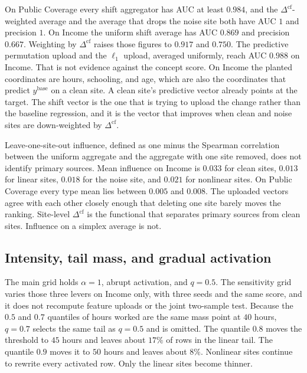 On Public Coverage every shift aggregator has AUC at least $0.984$, and
the $\Delta^{\mathrm{cf}}$-weighted average and the average that drops the
noise site both have AUC $1$ and precision $1$.
On Income the uniform shift average has AUC $0.869$ and precision $0.667$.
Weighting by $\Delta^{\mathrm{cf}}$ raises those figures to $0.917$ and
$0.750$.
The predictive permutation upload and the $\ell_1$ upload, averaged
uniformly, reach AUC $0.988$ on Income.
That is not evidence against the concept score.
On Income the planted coordinates are hours, schooling, and age, which are
also the coordinates that predict $y^{\mathrm{base}}$ on a clean site.
A clean site's predictive vector already points at the target.
The shift vector is the one that is trying to upload the change rather than
the baseline regression, and it is the vector that improves when clean and
noise sites are down-weighted by $\Delta^{\mathrm{cf}}$.

Leave-one-site-out influence, defined as one minus the Spearman
correlation between the uniform aggregate and the aggregate with one site
removed, does not identify primary sources.
Mean influence on Income is $0.033$ for clean sites, $0.013$ for linear
sites, $0.018$ for the noise site, and $0.021$ for nonlinear sites.
On Public Coverage every type mean lies between $0.005$ and $0.008$.
The uploaded vectors agree with each other closely enough that deleting one
site barely moves the ranking.
Site-level $\Delta^{\mathrm{cf}}$ is the functional that separates primary
sources from clean sites.
Influence on a simplex average is not.

\subsection{Intensity, tail mass, and gradual activation}
\label{sec:sensitivity}

The main grid holds $\alpha=1$, abrupt activation, and $q=0.5$.
The sensitivity grid varies those three levers on Income only, with three
seeds and the same score, and it does not recompute feature uploads or the
joint two-sample test.
Because the $0.5$ and $0.7$ quantiles of hours worked are the same mass
point at $40$ hours, $q=0.7$ selects the same tail as $q=0.5$ and is
omitted.
The quantile $0.8$ moves the threshold to $45$ hours and leaves about
$17\%$ of rows in the linear tail.
The quantile $0.9$ moves it to $50$ hours and leaves about $8\%$.
Nonlinear sites continue to rewrite every activated row.
Only the linear sites become thinner.

